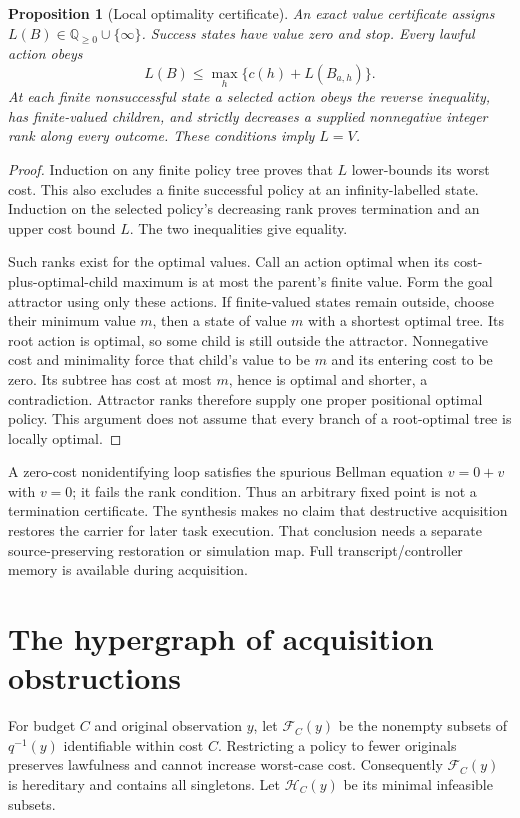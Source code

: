 \documentclass[11pt]{article}
\newtheorem{proposition}[theorem]{Proposition}
\theoremstyle{definition}
\begin{document}
\begin{proposition}[Local optimality certificate]
An exact value certificate assigns $L(B)\in\mathbb Q_{\ge0}\cup\{\infty\}$.
Success states have value zero and stop. Every lawful action obeys
\[
 L(B)\le\max_h\{c(h)+L(B_{a,h})\}.
\]
At each finite nonsuccessful state a selected action obeys the reverse
inequality, has finite-valued children, and strictly decreases a supplied
nonnegative integer rank along every outcome. These conditions imply $L=V$.
\end{proposition}
\begin{proof}
Induction on any finite policy tree proves that $L$ lower-bounds its worst
cost. This also excludes a finite successful policy at an infinity-labelled
state. Induction on the selected policy's decreasing rank proves termination
and an upper cost bound $L$. The two inequalities give equality.

Such ranks exist for the optimal values. Call an action optimal when its
cost-plus-optimal-child maximum is at most the parent's finite value.
Form the goal attractor using only these actions. If finite-valued states
remain outside, choose their minimum value $m$, then a state of value $m$
with a shortest optimal tree. Its root action is optimal, so some child is
still outside the attractor. Nonnegative cost and minimality force that
child's value to be $m$ and its entering cost to be zero. Its subtree has
cost at most $m$, hence is optimal and shorter, a contradiction. Attractor
ranks therefore supply one proper positional optimal policy. This argument
does not assume that every branch of a root-optimal tree is locally optimal.
\end{proof}

A zero-cost nonidentifying loop satisfies the spurious Bellman equation
$v=0+v$ with $v=0$; it fails the rank condition. Thus an arbitrary fixed point
is not a termination certificate. The synthesis makes no claim that
destructive acquisition restores the carrier for later task execution.
That conclusion needs a separate source-preserving restoration or simulation
map. Full transcript/controller memory is available during acquisition.

\section{The hypergraph of acquisition obstructions}
For budget $C$ and original observation $y$, let $\mathcal F_C(y)$ be the
nonempty subsets of $q^{-1}(y)$ identifiable within cost $C$. Restricting a
policy to fewer originals preserves lawfulness and cannot increase worst-case
cost. Consequently $\mathcal F_C(y)$ is hereditary and contains all
singletons. Let $\mathcal H_C(y)$ be its minimal infeasible subsets.
\end{document}
